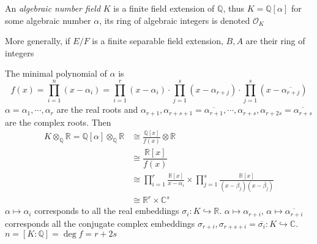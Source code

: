 \documentclass[main]{subfiles}
\begin{document}
\begin{definition}
An \textit{algebraic number field} $K$ is a finite field extension of $\mathbb Q$, thus $K=\mathbb Q[\alpha]$ for some algebraic number $\alpha$, its ring of algebraic integers is denoted $\mathcal O_K$
\begin{center}
\end{center}
More generally, if $E/F$ is a finite separable field extension, $B,A$ are their ring of integers
\begin{center}
\end{center}
\end{definition}

\begin{definition}
The minimal polynomial of $\alpha$ is
\[f(x)=\prod_{i=1}^n(x-\alpha_i)=\prod_{i=1}^r(x-\alpha_i)\cdot\prod_{j=1}^s(x-\alpha_{r+j})\cdot\prod_{j=1}^s(x-\overline{\alpha_{r+j}})\]
$\alpha=\alpha_1,\cdots,\alpha_r$ are the real roots and $\alpha_{r+1},\alpha_{r+s+1}=\overline{\alpha_{r+1}},\cdots,\alpha_{r+s},\alpha_{r+2s}=\overline{\alpha_{r+s}}$ are the complex roots. Then
\begin{align*}
K\otimes_{\mathbb Q}\mathbb R=\mathbb Q[\alpha]\otimes_{\mathbb Q}\mathbb R&\cong\frac{\mathbb Q[x]}{f(x)}\otimes\mathbb R \\
&\cong\dfrac{\mathbb R[x]}{f(x)} \\
&\cong\prod_{i=1}^r\frac{\mathbb R[x]}{x-\alpha_i}\times\prod_{j=1}^s\frac{\mathbb R[x]}{(x-\beta_j)(x-\overline{\beta_j})} \\
&\cong \mathbb R^r\times\mathbb C^s
\end{align*}
$\alpha\mapsto\alpha_i$ corresponds to all the real embeddings $\sigma_i: K\hookrightarrow\mathbb R$. $\alpha\mapsto\alpha_{r+i}$, $\alpha\mapsto\overline{\alpha_{r+i}}$ corresponds all the conjugate complex embeddings $\sigma_{r+i},\sigma_{r+s+i}=\overline{\sigma_i}:K\hookrightarrow\mathbb C$. $n=[K:\mathbb Q]=\deg f=r+2s$
\end{definition}
\end{document}
